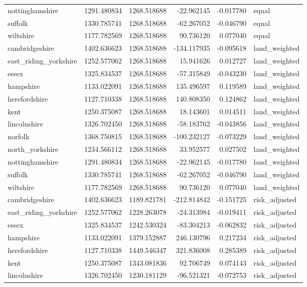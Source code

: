 \begin{tabular}{lrrrrl}
nottinghamshire & 1291.480834 & 1268.518688 & -22.962145 & -0.017780 & equal \\
suffolk & 1330.785741 & 1268.518688 & -62.267052 & -0.046790 & equal \\
wiltshire & 1177.782569 & 1268.518688 & 90.736120 & 0.077040 & equal \\
cambridgeshire & 1402.636623 & 1268.518688 & -134.117935 & -0.095618 & land\_weighted \\
east\_riding\_yorkshire & 1252.577062 & 1268.518688 & 15.941626 & 0.012727 & land\_weighted \\
essex & 1325.834537 & 1268.518688 & -57.315849 & -0.043230 & land\_weighted \\
hampshire & 1133.022091 & 1268.518688 & 135.496597 & 0.119589 & land\_weighted \\
herefordshire & 1127.710338 & 1268.518688 & 140.808350 & 0.124862 & land\_weighted \\
kent & 1250.375087 & 1268.518688 & 18.143601 & 0.014511 & land\_weighted \\
lincolnshire & 1326.702450 & 1268.518688 & -58.183762 & -0.043856 & land\_weighted \\
norfolk & 1368.750815 & 1268.518688 & -100.232127 & -0.073229 & land\_weighted \\
north\_yorkshire & 1234.566112 & 1268.518688 & 33.952577 & 0.027502 & land\_weighted \\
nottinghamshire & 1291.480834 & 1268.518688 & -22.962145 & -0.017780 & land\_weighted \\
suffolk & 1330.785741 & 1268.518688 & -62.267052 & -0.046790 & land\_weighted \\
wiltshire & 1177.782569 & 1268.518688 & 90.736120 & 0.077040 & land\_weighted \\
cambridgeshire & 1402.636623 & 1189.821781 & -212.814842 & -0.151725 & risk\_adjusted \\
east\_riding\_yorkshire & 1252.577062 & 1228.263078 & -24.313984 & -0.019411 & risk\_adjusted \\
essex & 1325.834537 & 1242.530324 & -83.304213 & -0.062832 & risk\_adjusted \\
hampshire & 1133.022091 & 1379.152887 & 246.130796 & 0.217234 & risk\_adjusted \\
herefordshire & 1127.710338 & 1449.546347 & 321.836008 & 0.285389 & risk\_adjusted \\
kent & 1250.375087 & 1343.081836 & 92.706749 & 0.074143 & risk\_adjusted \\
lincolnshire & 1326.702450 & 1230.181129 & -96.521321 & -0.072753 & risk\_adjusted \\

\end{tabular}
